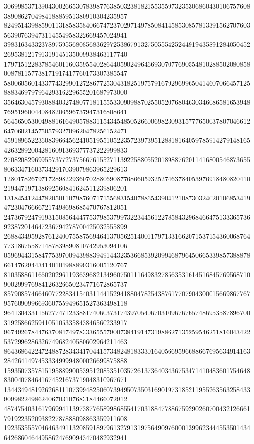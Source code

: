 \begin{DoxyCode}
      306998537139043002665307839877638503238182155355973235306860430106757608389086270498418885951380910304235957
      824951439885901131858358406674723702971497850841458530857813391562707603563907639473114554958322669457024941
      398316343323789759556808568362972538679132750555425244919435891284050452269538121791319145135009938463117740
      179715122837854601160359554028644059024964669307077690554810288502080858008781157738171917417760173307385547
      580060560143377432990127286772530431825197579167929699650414607066457125888346979796429316229655201687973000
      356463045793088403274807718115553309098870255052076804630346086581653948769519600440848206596737947316808641
      564565053004988161649057883115434548505266006982309315777650037807046612647060214575057932709620478256152471
      459189652236083966456241051955105223572397395128818164059785914279148165426328920042816091369377737222999833
      270820829699557377273756676155271139225880552018988762011416800546873655806334716037342917039079863965229613
      128017826797172898229360702880690877686605932527463784053976918480820410219447197138692560841624511239806201
      131845412447820501107987607171556831540788654390412108730324020106853419472304766667217498698685470767812051
      247367924791931508564447753798537997322344561227858432968466475133365736923872014647236794278700425032555899
      268843495928761240075587569464137056251400117971331662071537154360068764773186755871487839890810742953094106
      059694431584775397009439883949144323536685392099468796450665339857388878661476294434140104988899316005120767
      810358861166020296119363968213496075011164983278563531614516845769568710900299976984126326650234771672865737
      857908574664607722834154031144152941880478254387617707904300015669867767957609099669360755949651527363498118
      964130433116627747123388174060373174397054067031096767657486953587896700319258662594105105335843846560233917
      967492678447637084749783336555790073841914731988627135259546251816043422537299628632674968240580602964211463
      864368642247248872834341704415734824818333016405669596688667695634914163284264149745333499994800026699875888
      159350735781519588990053951208535103572613736403436753471410483601754648830040784641674521673719048310967671
      134434948192626811107399482506073949507350316901973185211955263563258433909982249862406703107683184466072912
      487475403161796994113973877658998685541703188477886759290260700432126661791922352093822787888098863359911608
      192353555704646349113208591897961327913197564909760001399623444553501434642686046449586247690943470482932941

\end{DoxyCode}

